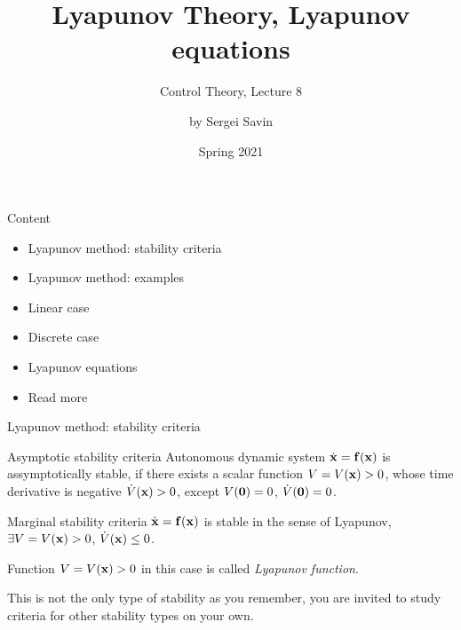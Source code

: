 \documentclass{beamer}
\title{Lyapunov Theory, Lyapunov equations}
\subtitle{Control Theory, Lecture 8}
\author{by Sergei Savin}
\date{Spring 2021}
\begin{document}
\maketitle


\begin{frame}{Content}

\begin{itemize}
\item Lyapunov method: stability criteria
\item Lyapunov method: examples
\item Linear case
\item Discrete case
\item Lyapunov equations
\item Read more
\end{itemize}

\end{frame}





\begin{frame}{Lyapunov method: stability criteria}
\begin{flushleft}

\begin{block}{Asymptotic stability criteria}
Autonomous dynamic system $\dot{\mathbf{x}} = \mathbf{f}(\mathbf{x})$ is assymptotically stable, if there exists a scalar function $V = V(\mathbf{x}) > 0$, whose time derivative is negative $\dot V(\mathbf{x}) > 0$, except $V(\mathbf{0}) = 0$, $\dot V(\mathbf{0}) = 0$.
\end{block}

\begin{block}{Marginal stability criteria}
$\dot{\mathbf{x}} = \mathbf{f}(\mathbf{x})$ is stable in the sense of Lyapunov, $\exists V = V(\mathbf{x}) > 0$, $\dot V(\mathbf{x}) \leq 0$.
\end{block}

\begin{definition}
Function $V = V(\mathbf{x}) > 0$ in this case is called \emph{Lyapunov function}.
\end{definition}

\bigskip

This is not the only type of stability as you remember, you are invited to study criteria for other stability types on your own.

\end{flushleft}
\end{frame}
\end{document}
